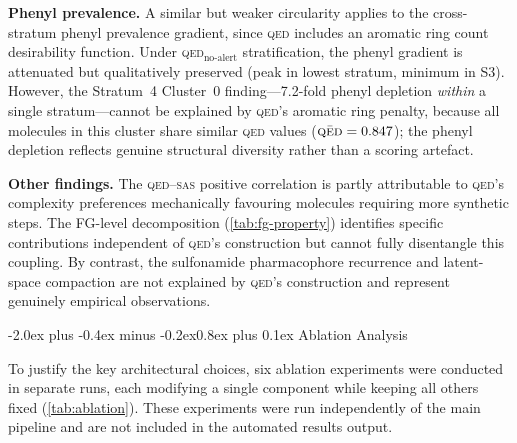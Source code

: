 \documentclass[10pt,a4paper,twocolumn]{article}
\makeatletter
\providecommand{\qed}{}
\let\qed\relax
\newcommand{\qedscore}{\textsc{qed}}
\let\qed\qedscore
\newcommand{\sas}{\textsc{sas}}
\renewcommand\subsection{\@startsection{subsection}{2}{\z@}%
  {-2.0ex plus -0.4ex minus -0.2ex}{0.8ex plus 0.1ex}%
  {\normalfont\large\bfseries}}
\makeatother
\begin{document}
\textbf{Phenyl prevalence.} A similar but weaker circularity applies to the cross-stratum phenyl prevalence gradient, since \qed{} includes an aromatic ring count desirability function. Under \qed{}$_{\mathrm{no\text{-}alert}}$ stratification, the phenyl gradient is attenuated but qualitatively preserved (peak in lowest stratum, minimum in S3). However, the Stratum~4 Cluster~0 finding---7.2-fold phenyl depletion \emph{within} a single stratum---cannot be explained by \qed{}'s aromatic ring penalty, because all molecules in this cluster share similar \qed{} values ($\bar{\qed{}} = 0.847$); the phenyl depletion reflects genuine structural diversity rather than a scoring artefact.

\textbf{Other findings.} The \qed{}--\sas{} positive correlation is partly attributable to \qed{}'s complexity preferences mechanically favouring molecules requiring more synthetic steps. The FG-level decomposition (\cref{tab:fg-property}) identifies specific contributions independent of \qed{}'s construction but cannot fully disentangle this coupling. By contrast, the sulfonamide pharmacophore recurrence and latent-space compaction are not explained by \qed{}'s construction and represent genuinely empirical observations.

\subsection{Ablation Analysis}
\label{sec:ablation}

To justify the key architectural choices, six ablation experiments were conducted in separate runs, each modifying a single component while keeping all others fixed (\cref{tab:ablation}). These experiments were run independently of the main pipeline and are not included in the automated results output.
\end{document}
